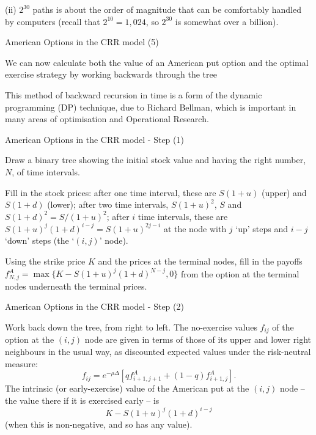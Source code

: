 	(ii) $2^{30}$ paths is about the order of magnitude that can be
comfortably handled by computers (recall that $2^{10} = 1,024$, so
$2^{30}$ is somewhat over a billion).



{ American Options in the CRR model (5)}


	We can now calculate both the value of an American put option and
the optimal exercise strategy by working backwards through the
tree

	This method of backward recursion in time is a form of the
dynamic programming (DP) technique, \label{dynamic programming}
due to Richard Bellman, which is important in many areas of
optimisation and Operational Research.


{American Options in the CRR model - Step (1)}


	Draw a binary
tree showing the initial stock value and having the
right number, $N$, of time intervals.

	Fill in the stock prices: after one time interval, these are
$S(1+u)$ (upper) and $S(1+d)$ (lower); after two time intervals,
$S(1+u)^2$, $S$ and $ S(1+d)^2 = S/(1+u)^2$; after $i$ time
intervals, these are $S(1+u)^j (1+d)^{i-j} = S (1+u)^{2j- i}$ at
the node with
$j$ `up' steps and $i-j$ `down' steps (the `$(i,j)$' node).

	Using the strike price $K$ and the prices at the terminal
nodes, fill in the payoffs $f^A_{N,j} = \max\{K - S (1+u)^j
(1+d)^{N-j}, 0\}$ from the option
at the terminal nodes underneath the terminal prices.


{American Options in the CRR model - Step (2)}


\setcounter{enumi}{3}

	Work back down the tree, from right to left. The no-exercise
values $f_{ij}$ of the option at the $(i,j)$ node are given in
terms of those of its upper and lower right neighbours in the
usual way, as discounted expected values under the risk-neutral
measure:
$$
f_{ij} = e^{-\rho \Delta } [q f^A_{i+1,j+1} + (1 - q)
f^A_{i+1,j}].
$$
The intrinsic (or early-exercise) value of the American put at the
$(i,j)$
 node -- the value there if it is exercised early -- is
$$
K - S (1+u)^j (1+d)^{i-j}
$$
(when this is non-negative, and so has any value).

